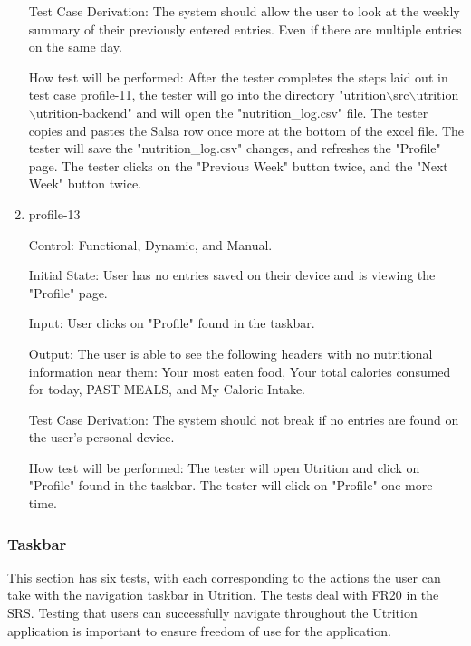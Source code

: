 \documentclass[12pt, titlepage]{article}
\begin{document}
\begin{enumerate}
		Test Case Derivation: The system should allow the user to look at the weekly summary of their previously entered entries. Even if there are multiple entries on the same day.
		
		How test will be performed: After the tester completes the steps laid out in test case profile-11, the tester will go into the directory "utrition$\backslash$src$\backslash$utrition$\backslash$utrition-backend" and will open the "nutrition\_log.csv" file. The tester copies and pastes the Salsa row once more at the bottom of the excel file. The tester will save the "nutrition\_log.csv" changes, and refreshes the "Profile" page. The tester clicks on the "Previous Week" button twice, and the "Next Week" button twice.
		
		\item{profile-13\\}
		
		Control: Functional, Dynamic, and Manual.
		
		Initial State: User has no entries saved on their device and is viewing the "Profile" page.
		
		Input: User clicks on "Profile" found in the taskbar.
		
		Output: The user is able to see the following headers with no nutritional information near them: Your most eaten food, Your total calories consumed for today, PAST MEALS, and My Caloric Intake.
		
		Test Case Derivation: The system should not break if no entries are found on the user's personal device.
		
		How test will be performed: The tester will open Utrition and click on "Profile" found in the taskbar. The tester will click on "Profile" one more time.
		
	\end{enumerate}
	
	\subsubsection{Taskbar}
	This section has six tests, with each corresponding to the actions the user can take with the navigation taskbar in Utrition. The tests deal with FR20 in the SRS. Testing that users can successfully navigate throughout the Utrition application is important to ensure freedom of use for the application.
	
\end{document}
